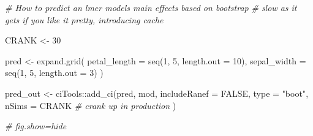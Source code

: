 \documentclass[
]{article}
\newenvironment{Shaded}{\begin{snugshade}}{\end{snugshade}}
\newcommand{\AttributeTok}[1]{\textcolor[rgb]{0.77,0.63,0.00}{#1}}
\newcommand{\CommentTok}[1]{\textcolor[rgb]{0.56,0.35,0.01}{\textit{#1}}}
\newcommand{\ConstantTok}[1]{\textcolor[rgb]{0.00,0.00,0.00}{#1}}
\newcommand{\DecValTok}[1]{\textcolor[rgb]{0.00,0.00,0.81}{#1}}
\newcommand{\FunctionTok}[1]{\textcolor[rgb]{0.00,0.00,0.00}{#1}}
\newcommand{\NormalTok}[1]{#1}
\newcommand{\OtherTok}[1]{\textcolor[rgb]{0.56,0.35,0.01}{#1}}
\newcommand{\SpecialCharTok}[1]{\textcolor[rgb]{0.00,0.00,0.00}{#1}}
\newcommand{\StringTok}[1]{\textcolor[rgb]{0.31,0.60,0.02}{#1}}
\begin{document}
\begin{Shaded}
\begin{Highlighting}[]
\CommentTok{\# How to predict an lmer model\textquotesingle{}s main effects based on bootstrap}
\CommentTok{\# slow as it gets if you like it pretty, introducing cache}

\NormalTok{CRANK }\OtherTok{\textless{}{-}} \DecValTok{30}

\NormalTok{pred }\OtherTok{\textless{}{-}} \FunctionTok{expand.grid}\NormalTok{(}
  \AttributeTok{petal\_length =} \FunctionTok{seq}\NormalTok{(}\DecValTok{1}\NormalTok{, }\DecValTok{5}\NormalTok{, }\AttributeTok{length.out =} \DecValTok{10}\NormalTok{),}
  \AttributeTok{sepal\_width  =} \FunctionTok{seq}\NormalTok{(}\DecValTok{1}\NormalTok{, }\DecValTok{5}\NormalTok{, }\AttributeTok{length.out =} \DecValTok{3}\NormalTok{)}
\NormalTok{)}

\NormalTok{pred\_out }\OtherTok{\textless{}{-}}\NormalTok{ ciTools}\SpecialCharTok{::}\FunctionTok{add\_ci}\NormalTok{(pred, mod,}
  \AttributeTok{includeRanef =} \ConstantTok{FALSE}\NormalTok{, }\AttributeTok{type =} \StringTok{"boot"}\NormalTok{,}
  \AttributeTok{nSims =}\NormalTok{ CRANK }\CommentTok{\# crank up in production}
\NormalTok{)}

\CommentTok{\# fig.show=\textquotesingle{}hide\textquotesingle{}}


\end{Highlighting}
\end{Shaded}
\end{document}
